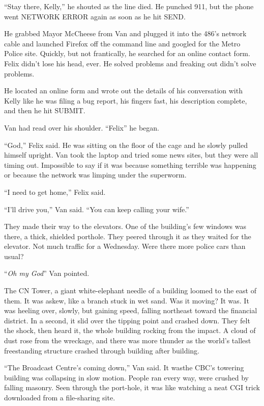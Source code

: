 “Stay there, Kelly,” he shouted as the line died. He punched 911,
but the phone went NETWORK ERROR again as soon as he hit SEND.

He grabbed Mayor McCheese from Van and plugged it into the 486’s
network cable and launched Firefox off the command line and googled
for the Metro Police site. Quickly, but not frantically, he
searched for an online contact form. Felix didn’t lose his head,
ever. He solved problems and freaking out didn’t solve problems.

He located an online form and wrote out the details of his
conversation with Kelly like he was filing a bug report, his
fingers fast, his description complete, and then he hit SUBMIT.

Van had read over his shoulder. “Felix\dash{}” he began.

“God,” Felix said. He was sitting on the floor of the cage and he
slowly pulled himself upright. Van took the laptop and tried some
news sites, but they were all timing out. Impossible to say if it
was because something terrible was happening or because the network
was limping under the superworm.

“I need to get home,” Felix said.

“I’ll drive you,” Van said. “You can keep calling your wife.”

They made their way to the elevators. One of the building’s few
windows was there, a thick, shielded porthole. They peered through
it as they waited for the elevator. Not much traffic for a
Wednesday. Were there more police cars than usual?

“\emph{Oh my God}\dash{}” Van pointed.

The CN Tower, a giant white-elephant needle of a building loomed to
the east of them. It was askew, like a branch stuck in wet sand.
Was it moving? It was. It was heeling over, slowly, but gaining
speed, falling northeast toward the financial district. In a
second, it slid over the tipping point and crashed down. They felt
the shock, then heard it, the whole building rocking from the
impact. A cloud of dust rose from the wreckage, and there was more
thunder as the world’s tallest freestanding structure crashed
through building after building.

“The Broadcast Centre’s coming down,” Van said. It was\dash{}the CBC’s
towering building was collapsing in slow motion. People ran every
way, were crushed by falling masonry. Seen through the port-hole,
it was like watching a neat CGI trick downloaded from a
file-sharing site.

